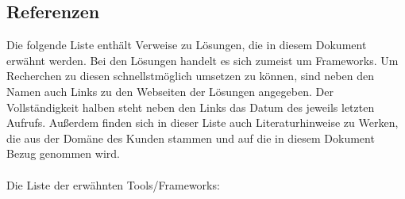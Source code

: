 \documentclass[enabledeprecatedfontcommands,fontsize=11pt,paper=a4,twoside]{scrartcl}
\begin{document}
\subsection{Referenzen} 
Die folgende Liste enthält Verweise zu Lösungen, die in diesem Dokument erwähnt werden. Bei den Lösungen handelt es sich zumeist um Frameworks. Um Recherchen zu diesen schnellstmöglich umsetzen zu können, sind neben den Namen auch Links zu den Webseiten der Lösungen angegeben. Der Vollständigkeit halben steht neben den Links das Datum des jeweils letzten Aufrufs. Außerdem finden sich in dieser Liste auch Literaturhinweise zu Werken, die aus der Domäne des Kunden stammen und auf die in diesem Dokument Bezug genommen wird. \\ \\
Die Liste der erwähnten Tools/Frameworks: \\
\end{document}
